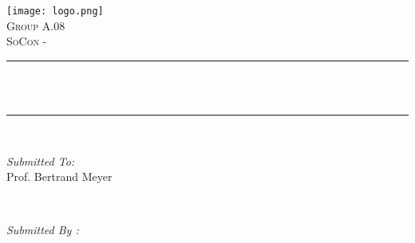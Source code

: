 \begin{titlepage}
    \centering
    \vspace*{0.2 cm}
    \hspace*{-1.1cm}\texttt{[image: logo.png]}\\[1.0 cm]   %
    \textsc{\LARGE Group A.08}\\[2.0 cm]    %
    \textsc{\Large SoCon - \projName}\\[0.5 cm]             %
    \rule{\linewidth}{0.2 mm} \\[0.4 cm]
    { \huge \bfseries \thetitle}\\
    \rule{\linewidth}{0.2 mm} \\[1.5 cm]

    \begin{minipage}{0.4\textwidth}
        \begin{flushleft} \large
            \emph{Submitted To:}\\
            Prof. Bertrand Meyer\\
            \end{flushleft}
            \end{minipage}~
            \begin{minipage}{0.4\textwidth}

            \begin{flushright} \large
            \emph{Submitted By :} \\
            \groupName\\~\\
            \studentOne\\
            \studentTwo\\
            \studentThree\\
        \end{flushright}

    \end{minipage}\\[2 cm]
    \vfill
    

\end{titlepage}
